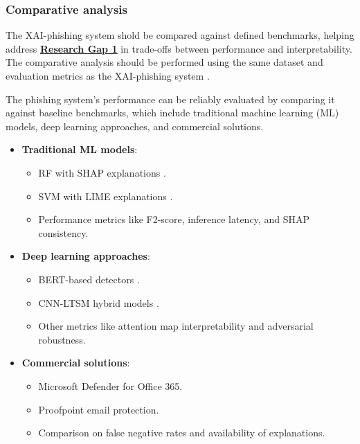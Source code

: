 
\subsubsection*{Comparative analysis}
The XAI-phishing system shold be compared against defined benchmarks, helping address \hyperref[research-gap-1]{\uline{\textbf{Research Gap 1}}} in trade-offs between performance and interpretability. The comparative analysis should be performed using the same dataset and evaluation metrics as the XAI-phishing system \citep{do2024integrated}.\newline

\noindent The phishing system's performance can be reliably evaluated by comparing it against baseline benchmarks, which include traditional machine learning (ML) models, deep learning approaches, and commercial solutions.

\begin{itemize}
  \item \textbf{Traditional ML models}:
  \begin{itemize}
    \item RF with SHAP explanations \citep{gupta2021novel}.
    \item SVM with LIME explanations \citep{andriu2023adaptive}.
    \item Performance metrics like F2-score, inference latency, and SHAP consistency.
  \end{itemize}
  \item \textbf{Deep learning approaches}:
  \begin{itemize}
    \item BERT-based detectors \citep{shirazi2022towards}.
    \item CNN-LTSM hybrid models \citep{alsariera2020ai}.
    \item Other metrics like attention map interpretability and adversarial robustness.
  \end{itemize}
  \item \textbf{Commercial solutions}:
  \begin{itemize}
    \item Microsoft Defender for Office 365.
    \item Proofpoint email protection.
    \item Comparison on false negative rates and availability of explanations.
  \end{itemize}
\end{itemize}

